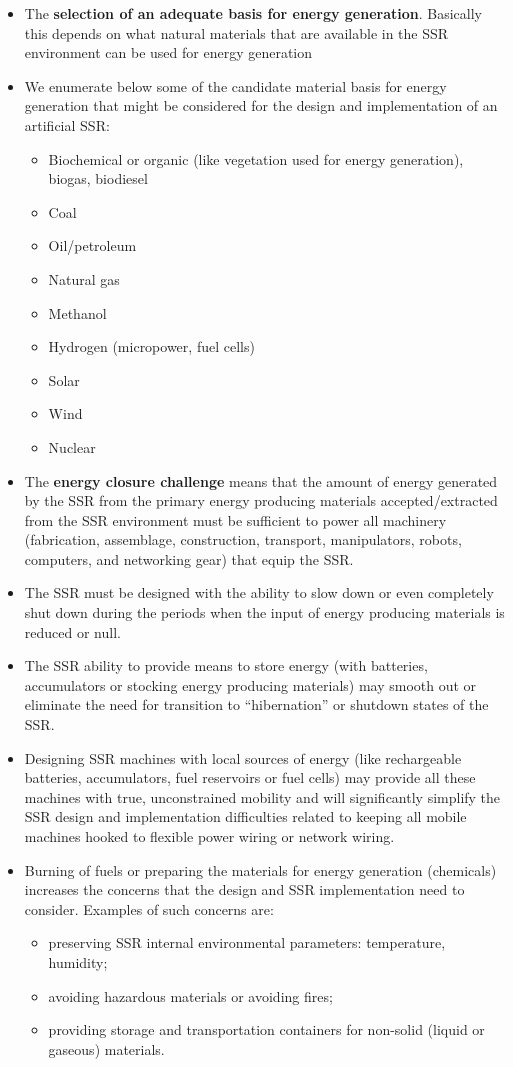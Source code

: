 \begin{itemize}
\item The \textbf{selection of an adequate basis for energy generation}.
Basically this depends on what natural materials that are available in
the SSR environment can be used for energy generation
\item We enumerate below some of the candidate material basis for energy
generation that might be considered for the design and implementation
of an artificial SSR:

\begin{itemize}
\item Biochemical or organic (like vegetation used for energy
generation), biogas, biodiesel
\item Coal
\item Oil/petroleum
\item Natural gas
\item Methanol
\item Hydrogen (micropower, fuel cells)
\item Solar
\item Wind
\item Nuclear
\end{itemize}
\item The \textbf{energy closure challenge} means that the amount of
energy generated by the SSR from the primary energy producing materials
accepted/extracted from the SSR environment must be sufficient to power
all machinery (fabrication, assemblage, construction, transport,
manipulators, robots, computers, and networking gear) that equip the
SSR.
\item The SSR must be designed with the ability to slow down or even
completely shut down during the periods when the input of energy
producing materials is reduced or null.
\item The SSR ability to provide means to store energy (with batteries,
accumulators or stocking energy producing materials) may smooth out or
eliminate the need for transition to “hibernation” or shutdown states
of the SSR.
\item Designing SSR machines with local sources of energy (like
rechargeable batteries, accumulators, fuel reservoirs or fuel cells)
may provide all these machines with true, unconstrained mobility and
will significantly simplify the SSR design and implementation
difficulties related to keeping all mobile machines hooked to flexible
power wiring or network wiring.
\item Burning of fuels or preparing the materials for energy generation
(chemicals) increases the concerns that the design and SSR
implementation need to consider. Examples of such concerns are: 

\begin{itemize}
\item preserving SSR internal environmental parameters: temperature,
humidity; 
\item avoiding hazardous materials or avoiding fires;
\item providing storage and transportation containers for non-solid
(liquid or gaseous) materials.
\end{itemize}
\end{itemize}
